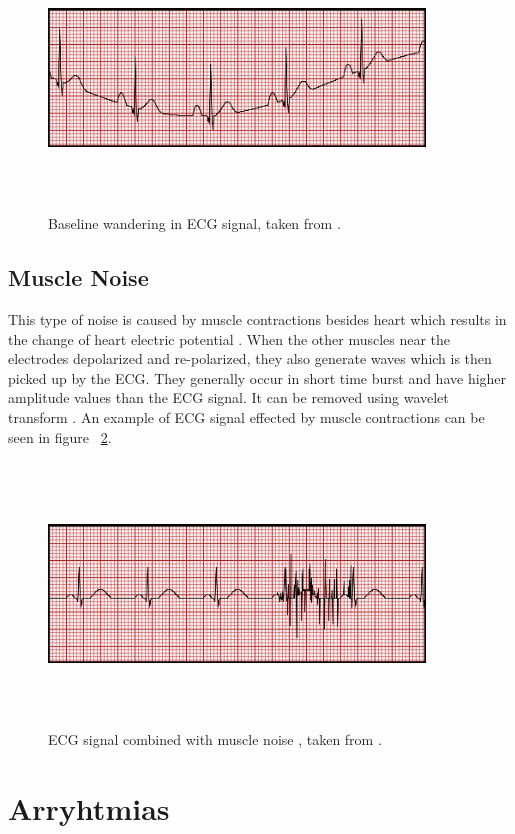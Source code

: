 \begin{figure}[htpb]
	\centering
	\includegraphics[width=10cm,height=7cm,keepaspectratio=true]{images/WBaseline}
	\caption{
		Baseline wandering in ECG signal, taken from \cite{ecg_artifacts}.
	}
	\label{fig:WBaseline}
\end{figure}

\subsection{Muscle Noise}
This type of noise is caused by muscle contractions besides heart which results in the change of heart electric potential \cite{markovski2013ict}. When the other muscles near the electrodes depolarized and re-polarized, they also generate waves which is then picked up by the ECG. They generally occur in short time burst and have higher amplitude values than the ECG signal. It can be removed using wavelet transform \cite{6091791}. An example of ECG signal effected by muscle contractions can be seen in figure ~\ref{fig:Tremor}.

\begin{figure}[htpb]
	\centering
	\includegraphics[width=10cm,height=7cm,keepaspectratio=true]{images/Tremor}
	\caption{
		ECG signal combined with muscle noise , taken from \cite{ecg_artifacts}.
	}
	\label{fig:Tremor}
\end{figure}

\section{Arryhtmias}

